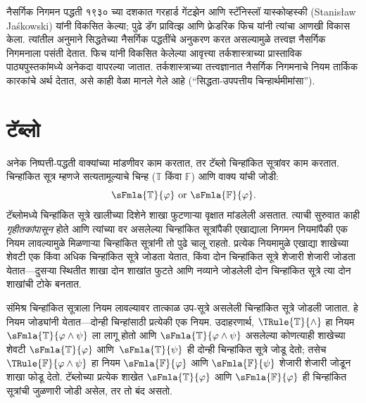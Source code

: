 \documentclass[11pt,a4paper,openany]{book}
\theoremstyle{definition}
\newcommand{\True}{\ensuremath{\mathbb{T}}}
\newcommand{\False}{\ensuremath{\mathbb{F}}}
\begin{document}
नैसर्गिक निगमन पद्धती १९३० च्या दशकात गरहार्ड गेंटझेन आणि स्टॅनिस्लॉ
यास्कोव्हस्की (Stanis\l{}aw Ja\'skowski) यांनी विकसित केल्या; पुढे डॅग
प्रावित्झ आणि फ्रेडरिक फिच यांनी त्यांचा आणखी विकास केला. त्यांतील अनुमाने
सिद्धतेच्या नैसर्गिक पद्धतींचे अनुकरण करत असल्यामुळे तत्त्वज्ञ नैसर्गिक
निगमनाला पसंती देतात.
फिच यांनी विकसित केलेल्या आवृत्त्या तर्कशास्त्राच्या प्रास्ताविक
पाठ्यपुस्तकांमध्ये अनेकदा वापरल्या जातात. तर्कशास्त्राच्या तत्त्वज्ञानात
नैसर्गिक निगमनाचे नियम तार्किक कारकांचे अर्थ देतात, असे काही वेळा मानले
गेले आहे (``सिद्धता-उपपत्तीय चिन्हार्थमीमांसा'').









\section{टॅब्लो}\label{fol:prf:tab:sec}

अनेक निष्पत्ती-पद्धती वाक्यांच्या मांडणीवर काम करतात, तर
टॅब्लो चिन्हांकित सूत्रांवर काम करतात. चिन्हांकित सूत्र म्हणजे
सत्यतामूल्याचे चिन्ह ($\True$ किंवा $\False$) आणि वाक्य यांची जोडी:
\[
\sFmla{\True}{\varphi} \text{ or } \sFmla{\False}{\varphi}.
\]
टॅब्लोमध्ये चिन्हांकित सूत्रे खालीच्या दिशेने शाखा फुटणाऱ्या
वृक्षात मांडलेली असतात. त्याची सुरुवात काही \emph{गृहीतकांपासून} होते आणि
त्यांच्या वर असलेल्या चिन्हांकित सूत्रांपैकी एखाद्याला निगमन नियमांपैकी एक
नियम लावल्यामुळे मिळणाऱ्या चिन्हांकित सूत्रांनी तो पुढे चालू राहतो.
प्रत्येक नियमामुळे एखाद्या शाखेच्या शेवटी एक किंवा अधिक चिन्हांकित सूत्रे
जोडता येतात, किंवा दोन चिन्हांकित सूत्रे शेजारी शेजारी जोडता येतात---दुसऱ्या
स्थितीत शाखा दोन शाखांत फुटते आणि नव्याने जोडलेली दोन चिन्हांकित सूत्रे त्या दोन शाखांची टोके बनतात.

संमिश्र चिन्हांकित सूत्राला नियम लावल्यावर तात्काळ उप-सूत्रे असलेली
चिन्हांकित सूत्रे जोडली जातात. हे नियम जोड्यांनी येतात—दोन्ही चिन्हांसाठी
प्रत्येकी एक नियम. उदाहरणार्थ, $\TRule{\True}{\land}$ हा नियम
$\sFmla{\True}{\varphi \land \psi}$ ला लागू होतो आणि
$\sFmla{\True}{\varphi \land \psi}$ असलेल्या कोणत्याही शाखेच्या शेवटी
$\sFmla{\True}{\varphi}$ आणि~$\sFmla{\True}{\psi}$ ही दोन्ही चिन्हांकित सूत्रे
जोडू देतो; तसेच $\TRule{\False}{\varphi \land \psi}$ हा नियम
$\sFmla{\False}{\varphi}$ आणि $\sFmla{\False}{\psi}$ शेजारी शेजारी जोडून शाखा
फोडू देतो. टॅब्लोच्या प्रत्येक शाखेत $\sFmla{\True}{\varphi}$ आणि
$\sFmla{\False}{\varphi}$ ही चिन्हांकित सूत्रांची जुळणारी जोडी असेल, तर तो
बंद असतो.
\end{document}
